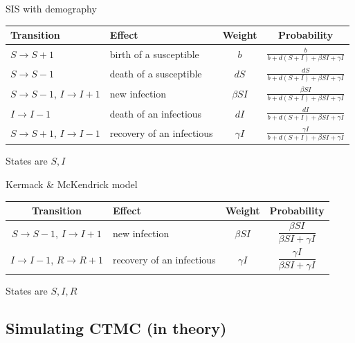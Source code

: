 \documentclass[aspectratio=169]{beamer}\usepackage[]{graphicx}\usepackage[]{xcolor}
\begin{document}
\begin{frame}{SIS with demography}
    \begin{center}
        \begin{tabular}{p{3cm}p{3cm}cc}
        \toprule
            Transition & Effect & Weight & Probability \\
          \midrule
            $S\to S+1$ & birth of a susceptible & $b$ & $\frac{b}{b+d(S+I)+\beta SI+\gamma I}$ \\
            $S\to S-1$ & death of a susceptible & $dS$ & $\frac{dS}{b+d(S+I)+\beta SI+\gamma I}$ \\
            $S\to S-1$, $I\to I+1$ & new infection & $\beta SI$ & $\frac{\beta SI}{b+d(S+I)+\beta SI+\gamma I}$ \\
            $I\to I-1$ & death of an infectious & $dI$ & $\frac{dI}{b+d(S+I)+\beta SI+\gamma I}$ \\
            $S\to S+1$, $I\to I-1$ & recovery of an infectious & $\gamma I$ & $\frac{\gamma I}{b+d(S+I)+\beta SI+\gamma I}$ \\
            \bottomrule
        \end{tabular}
    \end{center}
\vfill
States are $S,I$
\end{frame}


\begin{frame}[fragile]{Kermack \& McKendrick model}
    \begin{center}
        \begin{tabular}{cp{3cm}cc}
        \toprule
            Transition & Effect & Weight & Probability \\
            \midrule
            $S\to S-1$, $I\to I+1$ & new infection & $\beta SI$ & $\dfrac{\beta SI}{\beta SI+\gamma I}$ \\
            $I\to I-1$, $R\to R+1$ & recovery of an infectious & $\gamma I$ & $\dfrac{\gamma I}{\beta SI+\gamma I}$ \\
            \bottomrule
        \end{tabular}
    \end{center}
    \vfill
    States are $S,I,R$
\end{frame}


\subsection{Simulating CTMC (in theory)}
\end{document}
